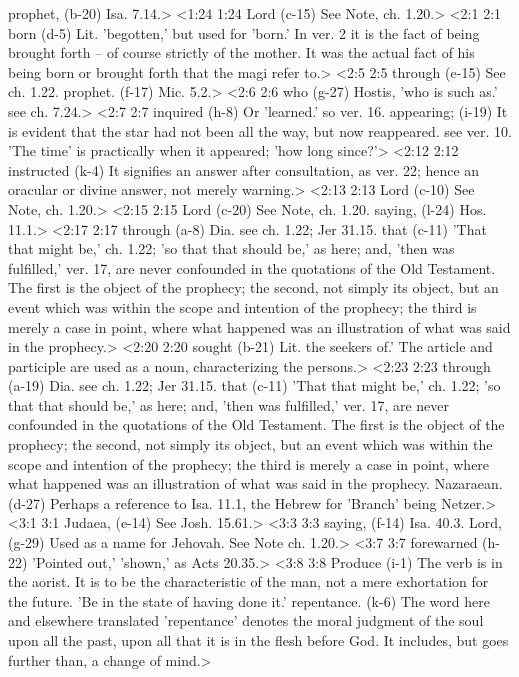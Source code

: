   prophet, (b-20)  Isa. 7.14.>
<1:24 1:24  Lord (c-15) See Note, ch. 1.20.>
<2:1 2:1  born (d-5)  Lit. 'begotten,' but used for 'born.' In ver. 2 it is the  fact of being brought forth -- of course strictly of the  mother. It was the actual fact of his being born or brought  forth that the magi refer to.>
<2:5 2:5  through (e-15)  See ch. 1.22.
  prophet. (f-17)  Mic. 5.2.>
<2:6 2:6  who (g-27)  Hostis, 'who is such as.' see ch. 7.24.>
<2:7 2:7  inquired (h-8)  Or 'learned.' so ver. 16.
  appearing; (i-19)  It is evident that the star had not been all the way, but now  reappeared. see ver. 10. 'The time' is practically when it  appeared; 'how long since?'>
<2:12 2:12  instructed (k-4)  It signifies an answer after consultation, as ver. 22; hence  an oracular or divine answer, not merely warning.>
<2:13 2:13  Lord (c-10) See Note, ch. 1.20.>
<2:15 2:15  Lord (c-20)  See Note, ch. 1.20.
  saying, (l-24)  Hos. 11.1.>
<2:17 2:17  through (a-8)  Dia. see ch. 1.22; Jer 31.15.
  that (c-11)  'That that might be,' ch. 1.22; 'so that that should be,' as  here; and, 'then was fulfilled,' ver. 17, are never confounded  in the quotations of the Old Testament. The first is the object  of the prophecy; the second, not simply its object, but an  event which was within the scope and intention of the prophecy;  the third is merely a case in point, where what happened was an  illustration of what was said in the prophecy.>
<2:20 2:20  sought (b-21)  Lit. the seekers of.' The article and participle are used as  a noun, characterizing the persons.>
<2:23 2:23  through (a-19)  Dia. see ch. 1.22; Jer 31.15.
  that (c-11)  'That that might be,' ch. 1.22; 'so that that should be,' as  here; and, 'then was fulfilled,' ver. 17, are never confounded  in the quotations of the Old Testament. The first is the object  of the prophecy; the second, not simply its object, but an  event which was within the scope and intention of the prophecy;  the third is merely a case in point, where what happened was an  illustration of what was said in the prophecy.
  Nazaraean. (d-27)  Perhaps a reference to Isa. 11.1, the Hebrew for 'Branch'  being Netzer.>
<3:1 3:1  Judaea, (e-14)  See Josh. 15.61.>
<3:3 3:3  saying, (f-14)  Isa. 40.3.
  Lord, (g-29)  Used as a name for Jehovah. See Note ch. 1.20.>
<3:7 3:7  forewarned (h-22)  'Pointed out,' 'shown,' as Acts 20.35.>
<3:8 3:8  Produce (i-1)  The verb is in the aorist. It is to be the characteristic of  the man, not a mere exhortation for the future. 'Be in the  state of having done it.'
  repentance. (k-6)  The word here and elsewhere translated 'repentance' denotes  the moral judgment of the soul upon all the past, upon all that  it is in the flesh before God. It includes, but goes further  than, a change of mind.>
